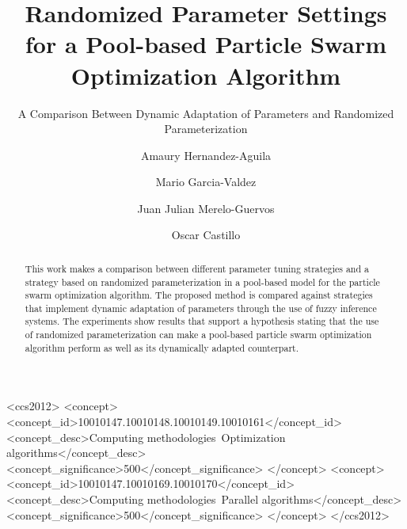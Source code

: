 \documentclass[sigconf]{acmart}
\begin{document}


\title{Randomized Parameter Settings for a Pool-based Particle Swarm Optimization Algorithm}
\subtitle{A Comparison Between Dynamic Adaptation of Parameters and Randomized Parameterization}

\author{Amaury Hernandez-Aguila}

\author{Mario Garcia-Valdez}

\author{Juan Julian Merelo-Guervos}

\author{Oscar Castillo}

\renewcommand{\shortauthors}{A. Hernandez-Aguila et al.}

\begin{abstract}
This work makes a comparison between different parameter tuning
strategies and a strategy based on randomized parameterization in a
pool-based model for the particle swarm optimization algorithm. The
proposed method is compared against strategies that implement dynamic
adaptation of parameters through the use of fuzzy inference
systems. %
The experiments show results that support a hypothesis stating that
the use of randomized parameterization can make a pool-based particle
swarm optimization algorithm perform as well as its dynamically
adapted counterpart.%
\end{abstract}

%
%
 \begin{CCSXML}
<ccs2012>
<concept>
<concept_id>10010147.10010148.10010149.10010161</concept_id>
<concept_desc>Computing methodologies~Optimization algorithms</concept_desc>
<concept_significance>500</concept_significance>
</concept>
<concept>
<concept_id>10010147.10010169.10010170</concept_id>
<concept_desc>Computing methodologies~Parallel algorithms</concept_desc>
<concept_significance>500</concept_significance>
</concept>
</ccs2012>
\end{CCSXML}
\end{document}
